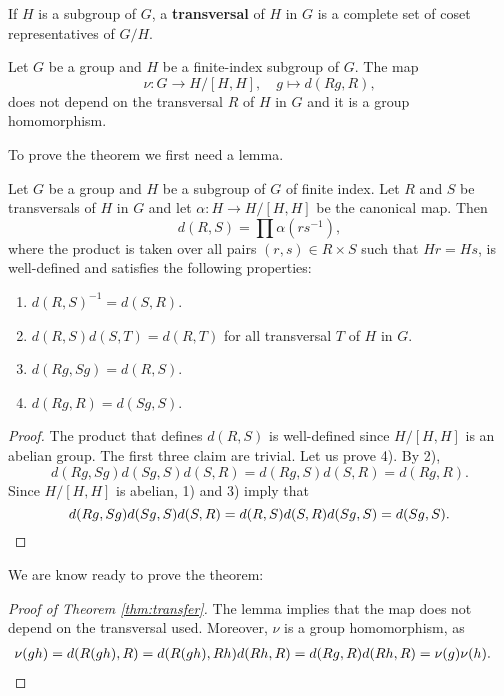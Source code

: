 If $H$ is a subgroup of $G$, a \textbf{transversal} of $H$ in $G$ is a complete
set of coset representatives of $G/H$. 

\begin{theorem}
	\label{thm:transfer}
	Let $G$ be a group and $H$ be a finite-index subgroup of $G$. The map 	
	\[
		\nu\colon G\to H/[H,H],\quad
		g\mapsto d(Rg,R),
	\]
	does not depend on the transversal $R$ of $H$ in $G$ and it is a group
	homomorphism. 
\end{theorem}

To prove the theorem we first need a lemma. 

\begin{lemma}
	\label{lem:d}
	Let $G$ be a group and $H$ be a subgroup of $G$ of finite index.  Let $R$
	and $S$ be transversals of $H$ in $G$ and let $\alpha\colon H\to H/[H,H]$
	be the canonical map. Then 
	\[
		d(R,S)=\prod \alpha(rs^{-1}),
	\]
	where the product is taken over all pairs 
	$(r,s)\in R\times S$ such that $Hr=Hs$,
	is well-defined and satisfies the following properties:
	\begin{enumerate}
		\item $d(R,S)^{-1}=d(S,R)$.
		\item $d(R,S)d(S,T)=d(R,T)$ for all transversal $T$ of $H$ in $G$.
		\item $d(Rg,Sg)=d(R,S)$.
		\item $d(Rg,R)=d(Sg,S)$.
	\end{enumerate}
\end{lemma}

\begin{proof}
	The product that defines $d(R,S)$ is well-defined since $H/[H,H]$ is 
	an abelian group. The first three claim are trivial. Let us prove
	4). By 2), 
	\[
		d(Rg,Sg)d(Sg,S)d(S,R)=d(Rg,S)d(S,R)=d(Rg,R).
	\]
	Since $H/[H,H]$ is abelian, 1) and 3) imply that 	
	\[
		d(Rg,Sg)d(Sg,S)d(S,R)=d(R,S)d(S,R)d(Sg,S)=d(Sg,S).\qedhere
	\]
\end{proof}

We are know ready to prove the theorem: 

\begin{proof}[Proof of Theorem \ref{thm:transfer}]
	The lemma implies that the map does not depend on the transversal used. 
	Moreover, $\nu$ is a group homomorphism, as 
	\begin{align*}
		\nu(gh)&=d(R(gh),R)
		=d(R(gh),Rh)d(Rh,R)
		=d(Rg,R)d(Rh,R)=\nu(g)\nu(h).\qedhere
	\end{align*}
\end{proof}

